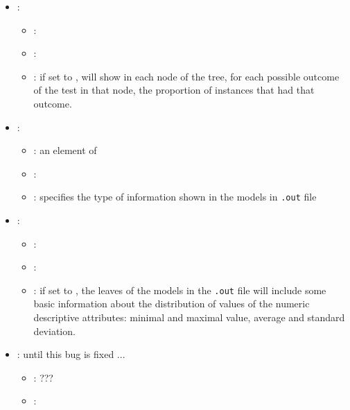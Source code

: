 \begin{itemize}
\begin{itemize}
           \end{itemize}
    \item {}:
           \begin{itemize}
                \item \optionPossibleValues{}: 
                \item \optionDefaultValue{}: 
                \item \optionDescrption{}:  if set to , \clus{} will show in each node of the tree, for each possible outcome of the test in that node, the proportion of instances that had that outcome.
           \end{itemize}
    \item {}:
           \begin{itemize}
                \item \optionPossibleValues{}: an element of 
                \item \optionDefaultValue{}: 
                \item \optionDescrption{}: specifies the type of information shown in the models in \texttt{.out} file
           \end{itemize}
    \item {}:
           \begin{itemize}
                \item \optionPossibleValues{}: 
                \item \optionDefaultValue{}: 
                \item \optionDescrption{}: if set to , the leaves of the models in the \texttt{.out} file will include some basic information about the distribution of values of the numeric
                descriptive attributes: minimal and maximal value, average and standard deviation.
           \end{itemize}
    \item {}: until this bug is fixed ...
           \begin{itemize}
                \item \optionPossibleValues{}: ???
                \item \optionDefaultValue{}: 

\end{itemize}
\end{itemize}
